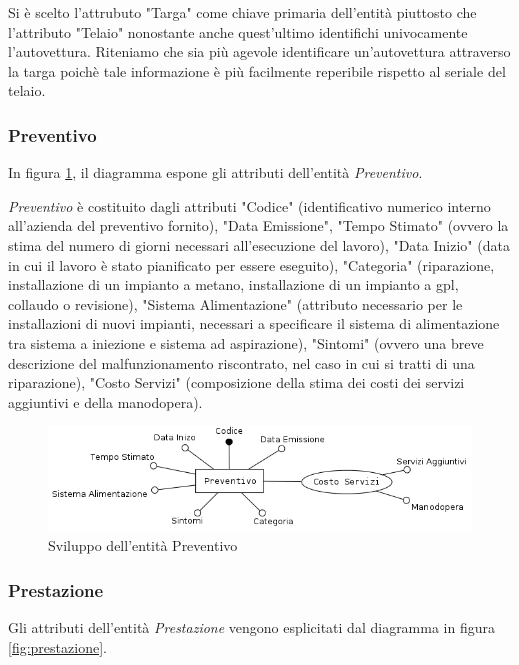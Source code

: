 			Si è scelto l'attrubuto "Targa" come chiave primaria dell'entità piuttosto che l'attributo "Telaio" nonostante anche quest'ultimo identifichi univocamente l'autovettura. Riteniamo che sia più agevole identificare un'autovettura attraverso la targa poichè tale informazione è più facilmente reperibile rispetto al seriale del telaio.
			
		\subsubsection{Preventivo}
		
			In figura \ref{fig:preventivo}, il diagramma espone gli attributi dell'entità \emph{Preventivo}.
			
			\emph{Preventivo} è costituito dagli attributi "Codice" (identificativo numerico interno all'azienda del preventivo fornito), "Data Emissione", "Tempo Stimato" (ovvero la stima del numero di giorni necessari all'esecuzione del lavoro), "Data Inizio" (data in cui il lavoro è stato pianificato per essere eseguito), "Categoria" (riparazione, installazione di un impianto a metano, installazione di un impianto a gpl, collaudo o revisione), "Sistema Alimentazione" (attributo necessario per le installazioni di nuovi impianti, necessari a specificare il sistema di alimentazione tra sistema a iniezione e sistema ad aspirazione), "Sintomi" (ovvero una breve descrizione del malfunzionamento riscontrato, nel caso in cui si tratti di una riparazione), "Costo Servizi" (composizione della stima dei costi dei servizi aggiuntivi e della manodopera).
			
			\begin{figure}[H]
				\centering
				\includegraphics[width=12cm]{images/finitures/preventivo.png}
				\caption{Sviluppo dell'entità Preventivo}
				\label{fig:preventivo}
			\end{figure}
			
		\subsubsection{Prestazione}
			
			Gli attributi dell'entità \emph{Prestazione} vengono esplicitati dal diagramma in figura \ref{fig:prestazione}.
			
